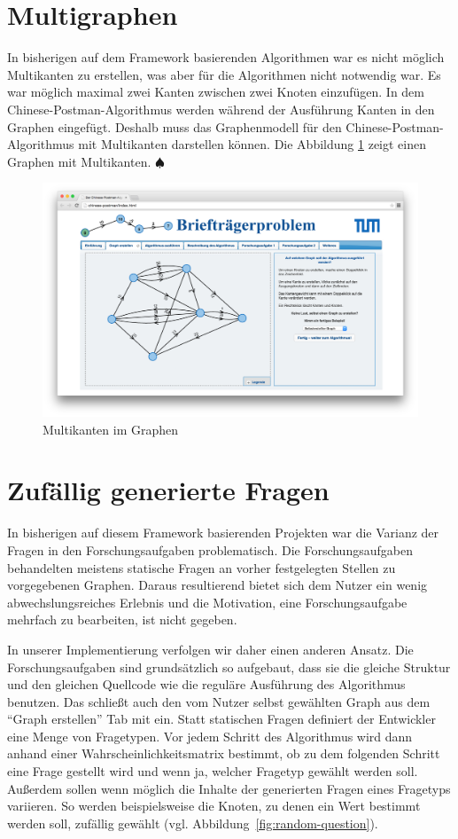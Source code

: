 \section{Multigraphen} %
In bisherigen auf dem Framework basierenden Algorithmen war es nicht möglich Multikanten zu erstellen, was aber für die Algorithmen nicht notwendig war. Es war möglich maximal zwei Kanten zwischen zwei Knoten einzufügen. 
In dem Chinese-Postman-Algorithmus werden während der Ausführung Kanten in den Graphen eingefügt. Deshalb muss das Graphenmodell für den Chinese-Postman-Algorithmus mit Multikanten darstellen können. Die Abbildung \ref{fig:multigraph} zeigt einen Graphen mit Multikanten. \hfill$\spadesuit$
\begin{figure}[h!]
	\centering
	\includegraphics[width=\textwidth]{figures/multigraph}
	\caption[Multigraph]{Multikanten im Graphen}\label{fig:multigraph}
\end{figure}

\section{Zufällig generierte Fragen} %
In bisherigen auf diesem Framework basierenden Projekten war die Varianz der Fragen in den Forschungsaufgaben problematisch. Die Forschungsaufgaben behandelten meistens statische Fragen an vorher festgelegten Stellen zu vorgegebenen Graphen. Daraus resultierend bietet sich dem Nutzer ein wenig abwechslungsreiches Erlebnis und die Motivation, eine Forschungsaufgabe mehrfach zu bearbeiten, ist nicht gegeben.

In unserer Implementierung verfolgen wir daher einen anderen Ansatz. Die Forschungsaufgaben sind grundsätzlich so aufgebaut, dass sie die gleiche Struktur und den gleichen Quellcode wie die reguläre Ausführung des Algorithmus benutzen. Das schließt auch den vom Nutzer selbst gewählten Graph aus dem \enquote{Graph erstellen} Tab mit ein. Statt statischen Fragen definiert der Entwickler eine Menge von Fragetypen. Vor jedem Schritt des Algorithmus wird dann anhand einer Wahrscheinlichkeitsmatrix bestimmt, ob zu dem folgenden Schritt eine Frage gestellt wird und wenn ja, welcher Fragetyp gewählt werden soll. Außerdem sollen wenn möglich die Inhalte der generierten Fragen eines Fragetyps variieren. So werden beispielsweise die Knoten, zu denen ein Wert bestimmt werden soll, zufällig gewählt (vgl. Abbildung~\ref{fig:random-question}).

